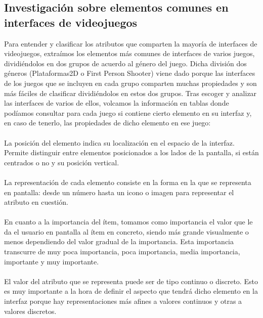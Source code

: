 \subsection{Investigación sobre elementos comunes en interfaces de videojuegos}

Para entender y clasificar los atributos que comparten la mayoría de interfaces de videojuegos, extraímos los elementos más comunes de interfaces de varios juegos, dividiéndolos en dos grupos de acuerdo al género del juego. Dicha división dos géneros (Plataformas2D o First Person Shooter) viene dado porque las interfaces de los juegos que se incluyen en cada grupo comparten muchas propiedades y son más fáciles de clasificar dividiéndolos en estos dos grupos.
Tras escoger y analizar las interfaces de varios de ellos, volcamos la información en tablas donde podíamos consultar para cada juego si contiene cierto elemento en su interfaz y, en caso de tenerlo, las propiedades de dicho elemento en ese juego:\\\\
La posición del elemento indica su localización en el espacio de la interfaz. Permite distinguir entre elementos posicionados a los lados de la pantalla, si están centrados o no y su posición vertical.\\\\
La representación de cada elemento consiste en la forma en la que se representa en pantalla: desde un número hasta un icono o imagen para representar el atributo en cuestión.\\\\
En cuanto a la importancia del ítem, tomamos como importancia el valor que le da el usuario en pantalla al ítem en concreto, siendo más grande visualmente o menos dependiendo del valor gradual de la importancia. Esta importancia transcurre de muy poca importancia, poca importancia, media importancia, importante y muy importante. \\\\
El valor del atributo que se representa puede ser de tipo continuo o discreto. Esto es muy importante a la hora de definir el aspecto que tendrá dicho elemento en la interfaz porque hay representaciones más afines a valores continuos y otras a valores discretos. \\\\

